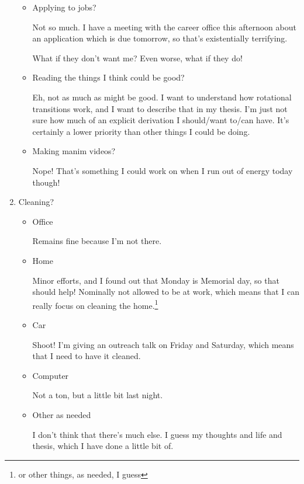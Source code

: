 \documentclass[12pt]{article}
\renewcommand{\,}{\textsuperscript{,}}
\begin{document}
\begin{enumerate}
\begin{itemize}
\item Applying to jobs?

Not so much. I have a meeting with the career office this afternoon about an application which is due tomorrow, so that's existentially terrifying.

What if they don't want me?  
Even worse, what if they do!

\item Reading the things I think could be good?

Eh, not as much as might be good. I want to understand how rotational transitions work, and I want to describe that in my thesis. I'm just not sure how much of an explicit derivation I should/want to/can have. It's certainly a lower priority than other things I could be doing.

\item Making manim videos?

Nope! That's something I could work on when I run out of energy today though!

\end{itemize}

\item Cleaning?

\begin{itemize}

\item Office

Remains fine because I'm not there.

\item Home

Minor efforts, and I found out that Monday is Memorial day, so that should help!  
Nominally not allowed to be at work, which means that I can really focus on cleaning the home.\footnote{or other things, as needed, I guess}

\item Car

Shoot! I'm giving an outreach talk on Friday and Saturday, which means that I need to have it cleaned.

\item Computer

Not a ton, but a little bit last night.

\item Other as needed

I don't think that there's much else. I guess my thoughts and life and thesis, which I have done a little bit of.

\end{itemize}


\end{enumerate}
\end{document}
